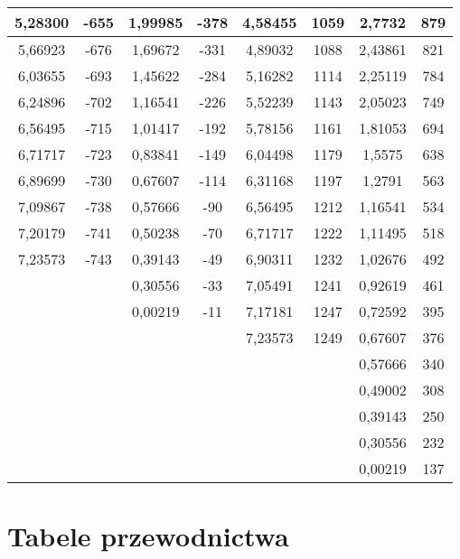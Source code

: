 \documentclass[a4paper,12pt]{article}
\numberwithin{equation}{section}
\begin{document}
\begin{appendices}
\begin{longtable}{|c|c|c|c|c|c|c|c|}
5,28300	&	-655		&	1,99985	&	-378		&	4,58455	&	1059		&	2,7732	&	879	\\\hline
5,66923	&	-676		&	1,69672	&	-331		&	4,89032	&	1088		&	2,43861	&	821	\\\hline
6,03655	&	-693		&	1,45622	&	-284		&	5,16282	&	1114		&	2,25119	&	784	\\\hline
6,24896	&	-702		&	1,16541	&	-226		&	5,52239	&	1143		&	2,05023	&	749	\\\hline
6,56495	&	-715		&	1,01417	&	-192		&	5,78156	&	1161		&	1,81053	&	694	\\\hline
6,71717	&	-723		&	0,83841	&	-149		&	6,04498	&	1179		&	1,5575	&	638	\\\hline
6,89699	&	-730		&	0,67607	&	-114		&	6,31168	&	1197		&	1,2791	&	563	\\\hline
7,09867	&	-738		&	0,57666	&	-90		&	6,56495	&	1212		&	1,16541	&	534	\\\hline
7,20179	&	-741		&	0,50238	&	-70		&	6,71717	&	1222		&	1,11495	&	518	\\\hline
7,23573	&	-743		&	0,39143	&	-49		&	6,90311	&	1232		&	1,02676	&	492	\\\hline
	 \multicolumn{2}{|c|}{}	&	0,30556	&	-33		&	7,05491	&	1241		&	0,92619	&	461	\\\cline{3-8}
	 \multicolumn{2}{|c|}{}	&	0,00219	&	-11		&	7,17181	&	1247		&	0,72592	&	395	\\\cline{3-8}
		 \multicolumn{4}{|c|}{}	&	7,23573	&	1249		&	0,67607	&	376	\\\cline{5-8}
\multicolumn{6}{|c|}{}	&	0,57666	&	340\\\cline{7-8}
\multicolumn{6}{|c|}{}	&	0,49002	&	308	\\\cline{7-8}
\multicolumn{6}{|c|}{}	&	0,39143	&	250	\\\cline{7-8}
\multicolumn{6}{|c|}{}		&	0,30556	&	232	\\\cline{7-8}
\multicolumn{6}{|c|}{}		&	0,00219	&	137	\\\hline
\end{longtable}





\clearpage
\section{Tabele przewodnictwa}


\end{appendices}
\end{document}
